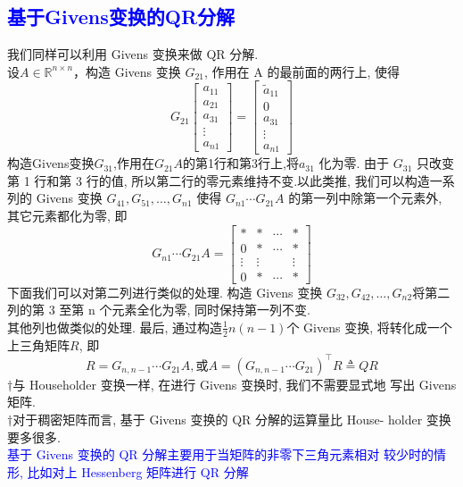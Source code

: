 \documentclass[12pt,a4paper]{article}
\begin{document}
\subsection{\textcolor{blue}{基于Givens变换的QR分解}}
我们同样可以利用 Givens 变换来做 QR 分解.\\
设$A \in \mathbb{R}^{n \times n}$，构造 Givens 变换 $G_{21}$, 作用在 A 的最前面的两行上, 使得
$$
G_{21}\left[\begin{array}{c}{a_{11}} \\ {a_{21}} \\ {a_{31}} \\ {\vdots} \\ {a_{n 1}}\end{array}\right]=\left[\begin{array}{c}{\tilde{a}_{11}} \\ {0} \\ {a_{31}} \\ {\vdots} \\ {a_{n 1}}\end{array}\right]
$$
构造Givens变换$G_{31}$,作用在$G_{21}A$的第1行和第3行上,将$a_{31}$ 化为零. 由于 $G_{31}$ 只改变第 1 行和第 3 行的值, 所以第二行的零元素维持不变.以此类推, 我们可以构造一系列的 Givens 变换 $G_{41}, G_{51}, \ldots, G_{n 1}$ 使得 $G_{n 1} \cdots G_{21} A$ 的第一列中除第一个元素外, 其它元素都化为零, 即
$$
G_{n 1} \cdots G_{21} A=
\left[\begin{array}{cccc}
{*} & {*} & {\cdots} & {*} \\ 
{0} & {*} & {\cdots} & {*} \\ 
{\vdots} & {\vdots} & & {\vdots} \\ 
{0} & {*} & {\cdots} & {*}
\end{array}\right]
$$
下面我们可以对第二列进行类似的处理. 构造 Givens 变换 $G_{32}, G_{42}, \ldots, G_{n 2}$将第二列的第 3 至第 n 个元素全化为零, 同时保持第一列不变. \\
其他列也做类似的处理. 最后, 通过构造$\frac{1}{2} n(n-1)$个 Givens 变换, 将转化成一个上三角矩阵$R$, 即
$$
R=G_{n, n-1} \cdots G_{21} A,或A=\left(G_{n, n-1} \cdots G_{21}\right)^{\top} R \triangleq Q R
$$
$\dagger$与 Householder 变换一样, 在进行 Givens 变换时, 我们不需要显式地 写出 Givens 矩阵.\\
$\dagger$对于稠密矩阵而言, 基于 Givens 变换的 QR 分解的运算量比 House- holder 变换要多很多.\\
\textcolor{blue}{基于 Givens 变换的 QR 分解主要用于当矩阵的非零下三角元素相对 较少时的情形, 比如对上 Hessenberg 矩阵进行 QR 分解}\\
\end{document}
